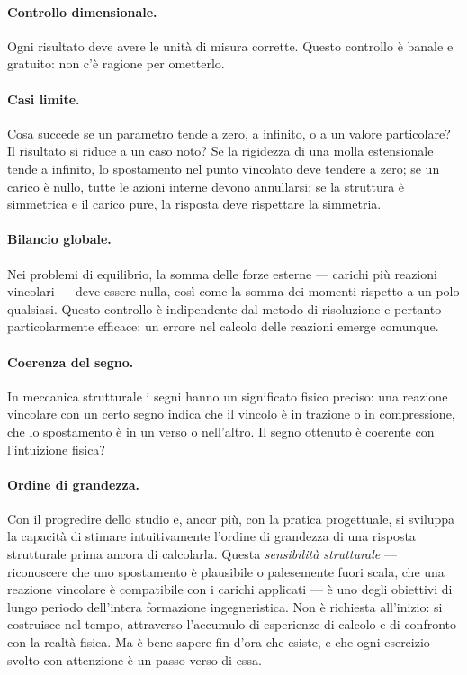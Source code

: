\paragraph{Controllo dimensionale.}
Ogni risultato deve avere le unità di misura corrette. Questo controllo è banale e gratuito: non c'è ragione per ometterlo.

\paragraph{Casi limite.}
Cosa succede se un parametro tende a zero, a infinito, o a un valore particolare? Il risultato si riduce a un caso noto? Se la rigidezza di una molla estensionale tende a infinito, lo spostamento nel punto vincolato deve tendere a zero; se un carico è nullo, tutte le azioni interne devono annullarsi; se la struttura è simmetrica e il carico pure, la risposta deve rispettare la simmetria.

\paragraph{Bilancio globale.}
Nei problemi di equilibrio, la somma delle forze esterne --- carichi più reazioni vincolari --- deve essere nulla, così come la somma dei momenti rispetto a un polo qualsiasi. Questo controllo è indipendente dal metodo di risoluzione e pertanto particolarmente efficace: un errore nel calcolo delle reazioni emerge comunque.

\paragraph{Coerenza del segno.}
In meccanica strutturale i segni hanno un significato fisico preciso: una reazione vincolare con un certo segno indica che il vincolo è in trazione o in compressione, che lo spostamento è in un verso o nell'altro. Il segno ottenuto è coerente con l'intuizione fisica?

\paragraph{Ordine di grandezza.}
Con il progredire dello studio e, ancor più, con la pratica progettuale, si sviluppa la capacità di stimare intuitivamente l'ordine di grandezza di una risposta strutturale prima ancora di calcolarla. Questa \textit{sensibilità strutturale} --- riconoscere che uno spostamento è plausibile o palesemente fuori scala, che una reazione vincolare è compatibile con i carichi applicati --- è uno degli obiettivi di lungo periodo dell'intera formazione ingegneristica. Non è richiesta all'inizio: si costruisce nel tempo, attraverso l'accumulo di esperienze di calcolo e di confronto con la realtà fisica. Ma è bene sapere fin d'ora che esiste, e che ogni esercizio svolto con attenzione è un passo verso di essa.


